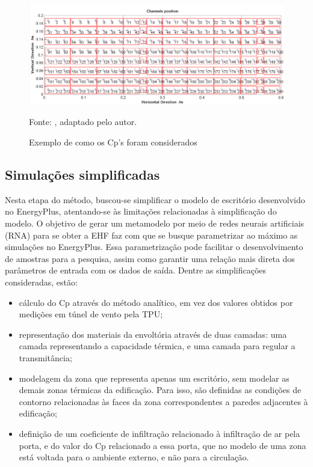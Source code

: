 \documentclass[brazil,hardcopy,openany,a5paper]{ufscthesis}
\begin{document}
		\begin{figure}[h]
			\centering
			\caption{Exemplo de como os Cp’s foram considerados}
			\includegraphics[width=1\linewidth]{img/tpu_windows.png}
			\label{fig:tpuwindows}
			\begin{flushleft}
				Fonte:  \cite{TPU2018}, adaptado pelo autor.
			\end{flushleft}
		\end{figure}
		
		
		\subsection{Simulações simplificadas}
		
		Nesta etapa do método, buscou-se simplificar o modelo de escritório desenvolvido no EnergyPlus, atentando-se às limitações relacionadas à simplificação do modelo.
		O objetivo de gerar um metamodelo por meio de redes neurais artificiais (RNA) para se obter a EHF faz com que se busque parametrizar ao máximo as simulações no EnergyPlus.
		Essa parametrização pode facilitar o desenvolvimento de amostras para a pesquisa, assim como garantir uma relação mais direta dos parâmetros de entrada com os dados de saída. 
		Dentre as simplificações consideradas, estão:
		
		\begin{itemize}
		\item cálculo do Cp através do método analítico, em vez dos valores obtidos por medições em túnel de vento pela TPU;
		\item representação dos materiais da envoltória através de duas camadas: uma camada representando a capacidade térmica, e uma camada para regular a transmitância;  %
		\item modelagem da zona que representa apenas um escritório, sem modelar as demais zonas térmicas da edificação. Para isso, são definidas as condições de contorno relacionadas às faces da zona correspondentes a paredes adjacentes à edificação;
		\item definição de um coeficiente de infiltração relacionado à infiltração de ar pela porta, e do valor do Cp relacionado a essa porta, que no modelo de uma zona está voltada para o ambiente externo, e não para a circulação.
		\end{itemize}
		
\end{document}

